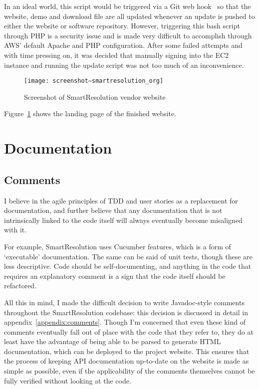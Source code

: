 In an ideal world, this script would be triggered via a Git web hook~\cite{github:webhooks} so that the website, demo and download file are all updated whenever an update is pushed to either the website or software repository. However, triggering this bash script through PHP is a security issue and is made very difficult to accomplish through AWS' default Apache and PHP configuration. After some failed attempts and with time pressing on, it was decided that manually signing into the EC2 instance and running the update script was not too much of an inconvenience.

\begin{figure}[h!]
  \centering
    \ifimages
    \texttt{[image: screenshot--smartresolution\_org]}
    \fi
  \caption{Screenshot of SmartResolution vendor website}
  \label{screenshot:smartresolutionOrg}
\end{figure}

Figure~\ref{screenshot:smartresolutionOrg} shows the landing page of the finished website.

\section{Documentation}

\subsection{Comments}

I believe in the agile principles of TDD and user stories as a replacement for documentation, and further believe that any documentation that is not intrinsically linked to the code itself will always eventually become misaligned with it.

For example, SmartResolution uses Cucumber features, which is a form of `executable' documentation. The same can be said of unit tests, though these are less descriptive. Code should be self-documenting, and anything in the code that requires an explanatory comment is a sign that the code itself should be refactored.

All this in mind, I made the difficult decision to write Javadoc-style comments throughout the SmartResolution codebase: this decision is discussed in detail in appendix~\ref{appendix:comments}. Though I'm concerned that even these kind of comments eventually fall out of place with the code that they refer to, they do at least have the advantage of being able to be parsed to generate HTML documentation, which can be deployed to the project website. This ensures that the process of keeping API documentation up-to-date on the website is made as simple as possible, even if the applicability of the comments themselves cannot be fully verified without looking at the code.


